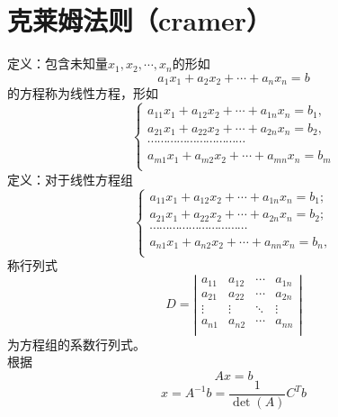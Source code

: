 \section{克莱姆法则（cramer）}
{\color{red}定义：}包含未知量$x_{1},x_{2},\cdots,x_{n}$的形如
$$a_{1}x_{1}+a_{2}x_{2}+\cdots+a_{n}x_{n}=b$$
的方程称为线性方程，形如
$$
\left\{ 
\begin{aligned}
{{a}_{11}}{{x}_{1}}+{{a}_{12}}{{x}_{2}}+\cdots +{{a}_{1n}}{{x}_{n}}={{b}_{1}},  \\
{{a}_{21}}{{x}_{1}}+{{a}_{22}}{{x}_{2}}+\cdots +{{a}_{2n}}{{x}_{n}}={{b}_{2}},  \\
\cdots \cdots \cdots \cdots \cdots \cdots \cdots \cdots \cdots \cdots   \\
{{a}_{m1}}{{x}_{1}}+{{a}_{m2}}{{x}_{2}}+\cdots +{{a}_{mn}}{{x}_{n}}={{b}_{m}}  \\
\end{aligned}
\right.
$$
{\color{red}定义：}对于线性方程组
\[\left\{ \begin{matrix}
{{a}_{11}}{{x}_{1}}+{{a}_{12}}{{x}_{2}}+\cdots +{{a}_{1n}}{{x}_{n}}={{b}_{1}};  \\
{{a}_{21}}{{x}_{1}}+{{a}_{22}}{{x}_{2}}+\cdots +{{a}_{2n}}{{x}_{n}}={{b}_{2}};  \\
\cdots \cdots  \cdots \cdots \cdots \cdots \cdots \cdots \cdots \cdots   \\
{{a}_{n1}}{{x}_{1}}+{{a}_{n2}}{{x}_{2}}+\cdots +{{a}_{nn}}{{x}_{n}}={{b}_{n}},  \\
\end{matrix} \right.\]
称行列式
$$
D=\left|\begin{matrix}
a_{11} & a_{12} & \cdots  & a_{1n}  \\
a_{21} & a_{22} & \cdots  & a_{2n}  \\
\vdots & \vdots & \ddots & \vdots   \\
a_{n1} & a_{n2} & \cdots  & a_{nn}  \\
\end{matrix} \right|
$$
为方程组的系数行列式。\\
根据
$$
Ax=b
$$
$$
x=A^{-1}b=\frac{1}{\det{(A)}}C^{T}b
$$
